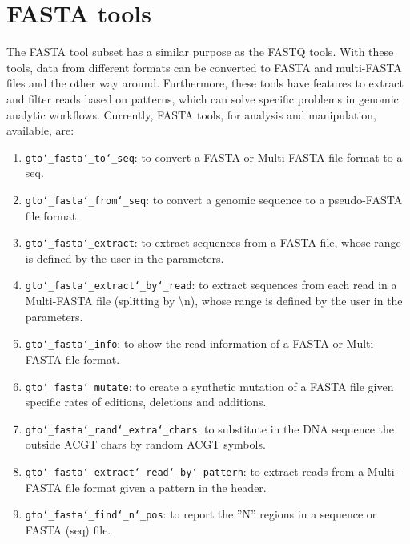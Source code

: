 \chapter{FASTA tools}
\label{fasta}
The FASTA tool subset has a similar purpose as the FASTQ tools. With these tools, data from different formats can be converted to FASTA and multi-FASTA files and the other way around. Furthermore, these tools have features to extract and filter reads based on patterns, which can solve specific problems in genomic analytic workflows. Currently, FASTA tools, for analysis and manipulation, available, are:
\begin{enumerate}

\item \texttt{gto\char`_fasta\char`_to\char`_seq}: to convert a FASTA or Multi-FASTA file format to a seq.

\item \texttt{gto\char`_fasta\char`_from\char`_seq}: to convert a genomic sequence to a pseudo-FASTA file format.

\item \texttt{gto\char`_fasta\char`_extract}: to extract sequences from a FASTA file, whose range is defined by the user in the parameters.

\item \texttt{gto\char`_fasta\char`_extract\char`_by\char`_read}: to extract sequences from each read in a Multi-FASTA file (splitting by \textbackslash n), whose range is defined by the user in the parameters.

\item \texttt{gto\char`_fasta\char`_info}: to show the read information of a FASTA or Multi-FASTA file format.

\item \texttt{gto\char`_fasta\char`_mutate}: to create a synthetic mutation of a FASTA file given specific rates of editions, deletions and additions.

\item \texttt{gto\char`_fasta\char`_rand\char`_extra\char`_chars}: to substitute in the DNA sequence the outside ACGT chars by random ACGT symbols.

\item \texttt{gto\char`_fasta\char`_extract\char`_read\char`_by\char`_pattern}: to extract reads from a Multi-FASTA file format given a pattern in the header.

\item \texttt{gto\char`_fasta\char`_find\char`_n\char`_pos}: to report the ''N'' regions in a sequence or FASTA (seq) file.


\end{enumerate}
